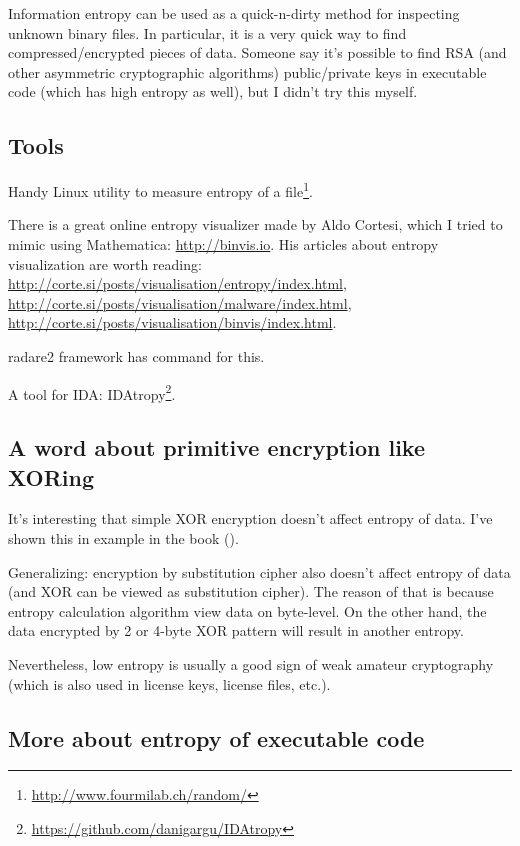 Information entropy can be used as a quick-n-dirty method for inspecting unknown binary files.
In particular, it is a very quick way to find compressed/encrypted pieces of data.
Someone say it's possible to find RSA (and other asymmetric cryptographic algorithms) public/private keys 
in executable code (which has high entropy as well), but I didn't try this myself.

\subsection{Tools}

Handy Linux  utility to measure entropy of a file\footnote{\url{http://www.fourmilab.ch/random/}}.

There is a great online entropy visualizer made by Aldo Cortesi, 
which I tried to mimic using Mathematica: \url{http://binvis.io}.
His articles about entropy visualization are worth reading:
\url{http://corte.si/posts/visualisation/entropy/index.html},
\url{http://corte.si/posts/visualisation/malware/index.html},
\url{http://corte.si/posts/visualisation/binvis/index.html}.

radare2 framework has  command for this.

A tool for IDA: IDAtropy\footnote{\url{https://github.com/danigargu/IDAtropy}}.

\subsection{A word about primitive encryption like XORing}

It's interesting that simple XOR encryption doesn't affect entropy of data.
I've shown this in  example in the book ().

Generalizing: encryption by substitution cipher also doesn't affect entropy of data (and XOR can be viewed as substitution cipher).
The reason of that is because entropy calculation algorithm view data on byte-level.
On the other hand, the data encrypted by 2 or 4-byte XOR pattern will result in another entropy.

Nevertheless, low entropy is usually a good sign of weak amateur cryptography
(which is also used in license keys, license files, etc.).

\subsection{More about entropy of executable code}

